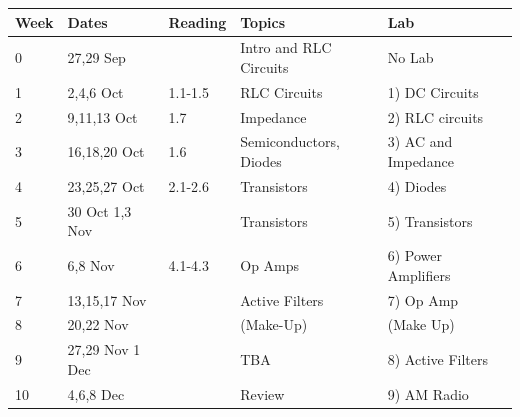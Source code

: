 \documentclass[12pt]{article}
\begin{document}
\begin{table}[h!]
\normalsize %
\begin{tabular}{ lllll }
\hline
\textbf{Week} & \textbf{Dates} & \textbf{Reading} & \textbf{Topics} & \textbf{Lab} \\
\hline
0 & 27,29 Sep & & Intro and RLC Circuits & No Lab \\
\hline
1 & 2,4,6 Oct &  1.1-1.5 & RLC Circuits & 1) DC Circuits \\
\hline
2 & 9,11,13 Oct & 1.7 & Impedance & 2) RLC circuits  \\
\hline
3 & 16,18,20 Oct &  1.6 & Semiconductors, Diodes  & 3) AC and Impedance \\
\hline
4 & 23,25,27 Oct & 2.1-2.6 & Transistors & 4) Diodes \\
\hline
5 & 30 Oct 1,3 Nov & & Transistors & 5) Transistors \\
\hline
6 & 6,8 Nov & 4.1-4.3 & Op Amps & 6) Power Amplifiers \\
\hline
7 & 13,15,17 Nov & &  Active Filters & 7) Op Amp \\
\hline
8 & 20,22 Nov & & (Make-Up) & (Make Up) \\
\hline
9 & 27,29 Nov 1 Dec & & TBA& 8) Active Filters \\
\hline
10 &  4,6,8 Dec & &  Review & 9) AM Radio \\
\hline
\end{tabular} 
\end{table}
\end{document}
